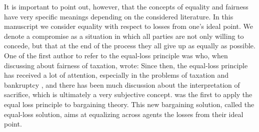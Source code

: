 It is important to point out, however, that the concepts of equality and fairness have very specific meanings depending on the considered literature. 
In this manuscript we consider equality with respect to losses from one's ideal point. 
We denote a compromise as a situation in which all parties are not only willing to concede, but that at the end of the process they all give up as equally as possible. 
One of the first author to refer to the equal-loss principle was \citet[p. 396]{Mill1849} who, when discussing about fairness of taxation, wrote: \textit{} 
Since then, the equal-loss principle has received a lot of attention, especially in the problems of taxation \citep{Edgeworth1897,Young1987} and bankruptcy \citep{Herrero2001, Aumann1985}, and there has been much discussion about the interpretation of sacrifice, which is ultimately a very subjective concept. \citet{Chun1988} was the first to apply the equal loss principle to bargaining theory. This new bargaining solution, called the equal-loss solution, aims at equalizing across agents the losses from their ideal point.

